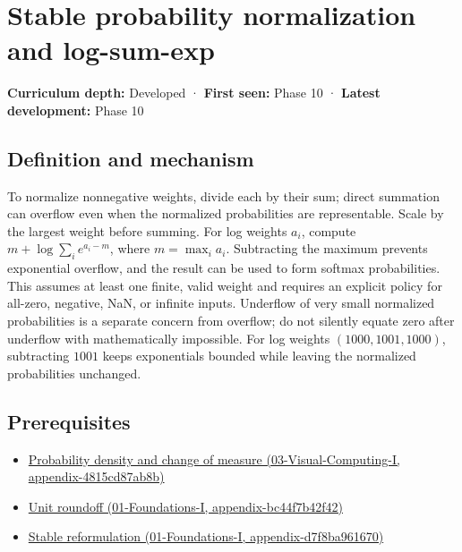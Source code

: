 \hypertarget{appendix-d580b422240f}{}
\section{Stable probability normalization and log-sum-exp}\label{appendix-d580b422240f-stable-probability-normalization-and-log-sum-exp}

\textbf{Curriculum depth:} Developed · \textbf{First seen:} Phase 10 · \textbf{Latest development:} Phase 10

\subsection{Definition and mechanism}\label{appendix-d580b422240f-definition-and-mechanism}

To normalize nonnegative weights, divide each by their sum; direct summation can overflow even when the normalized probabilities are representable. Scale by the largest weight before summing. For log weights \(a_i\), compute \(m+\log\sum_i e^{a_i-m}\), where \(m=\max_i a_i\). Subtracting the maximum prevents exponential overflow, and the result can be used to form softmax probabilities. This assumes at least one finite, valid weight and requires an explicit policy for all-zero, negative, NaN, or infinite inputs. Underflow of very small normalized probabilities is a separate concern from overflow; do not silently equate zero after underflow with mathematically impossible. For log weights \((1000,1001,1000)\), subtracting \(1001\) keeps exponentials bounded while leaving the normalized probabilities unchanged.

\subsection{Prerequisites}\label{appendix-d580b422240f-prerequisites}

\begin{itemize}
\tightlist
\item
  \href{../03-Visual-Computing-I/main.pdf\#nameddest=appendix-4815cd87ab8b}{Probability density and change of measure (03-Visual-Computing-I, appendix-4815cd87ab8b)}
\item
  \href{../01-Foundations-I/main.pdf\#nameddest=appendix-bc44f7b42f42}{Unit roundoff (01-Foundations-I, appendix-bc44f7b42f42)}
\item
  \href{../01-Foundations-I/main.pdf\#nameddest=appendix-d7f8ba961670}{Stable reformulation (01-Foundations-I, appendix-d7f8ba961670)}
\end{itemize}

